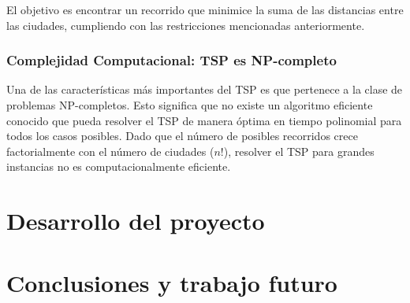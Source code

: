 \documentclass[12pt,titlepage,twoside,openright]{book}
\begin{document}
El objetivo es encontrar un recorrido que minimice la suma de las distancias entre las ciudades, cumpliendo con las restricciones mencionadas anteriormente.

\subsection{Complejidad Computacional: TSP es NP-completo}

Una de las características más importantes del TSP es que pertenece a la clase de problemas NP-completos. Esto significa que no existe un algoritmo eficiente conocido que pueda resolver el TSP de manera óptima en tiempo polinomial para todos los casos posibles. Dado que el número de posibles recorridos crece factorialmente con el número de ciudades ($n!$), resolver el TSP para grandes instancias no es computacionalmente eficiente.


\chapter{Desarrollo del proyecto}

\chapter{Conclusiones y trabajo futuro}



\begin{thebibliography}{0}

\end{thebibliography}
\end{document}
